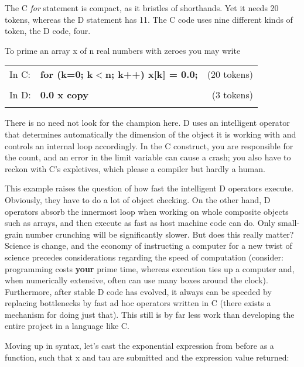 The C \emph{for} statement is compact,  as it bristles of shorthands.  Yet it needs  20 tokens,  whereas the D statement has 11.  The C code uses  nine different kinds of token, the D code, four.

To prime an array x of n real numbers with zeroes you may write\\

\begin{tabular}{>{\normalfont}l>{\sffamily\bfseries}l>{\normalfont}r}

In C: & for (k=0; k$<$n; k++) x[k] = 0.0; & (20 tokens)\\\\

In D: & 0.0 x copy & (3 tokens)\\\\

\end{tabular}

\noindent There is no need not look for the champion here.  D uses an  intelligent operator that determines automatically the dimension of the object it  is working  with  and  controls  an internal  loop  accordingly.  In  the  C construct,  you are responsible for the count,  and an error in the limit variable can cause a crash;  you also have to reckon with C's expletives, which please a compiler but hardly a human.

This example raises the question of how fast the intelligent D operators execute.  Obviously,  they  have to do a lot of object checking.  On  the other hand,  D operators absorb the innermost loop when working on  whole composite  objects  such  as arrays,  and then execute as  fast  as  host machine  code can do.  Only small-grain number crunching will  be  significantly slower.  But does this really matter?  Science is change, and the economy of   instructing  a  computer  for  a  new  twist  of  science   precedes considerations regarding the speed of computation (consider:  programming costs  \textbf{your} prime time,  whereas execution ties up a computer  and,  when numerically extensive,  often can use many boxes around the clock). Furthermore, after stable D code has evolved,  it always can be speeded by replacing bottlenecks by fast ad hoc operators written in C (there exists a mechanism for doing just that).  This still is by far less work than developing the entire project in a language like C.

Moving up in syntax, let's cast the exponential expression from before as a  function,  such that x and tau are submitted and the expression  value returned:\\

